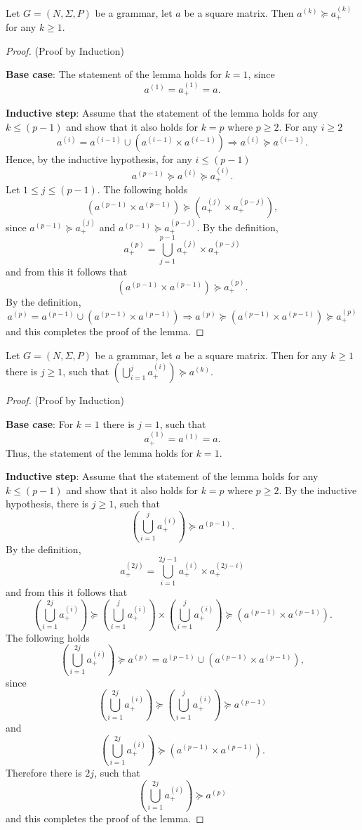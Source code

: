 \begin{lemma}\label{lemma:cf_geq_valiant}
	Let $G =(N,\Sigma,P)$ be a grammar, let $a$ be a square matrix. Then $a^{(k)} \succeq a^{(k)}_+$ for any $k \geq 1$.
\end{lemma}
\begin{proof}(Proof by Induction)
	
	\textbf{Base case}: The statement of the lemma holds for $k = 1$, since $$a^{(1)} = a^{(1)}_+ = a.$$
	
	\textbf{Inductive step}: Assume that the statement of the lemma holds for any $k \leq (p - 1)$ and show that it also holds for $k = p$ where $p \geq 2$. For any $i \geq 2$ $$a^{(i)} = a^{(i-1)} \cup (a^{(i-1)} \times a^{(i-1)}) \Rightarrow a^{(i)} \succeq a^{(i-1)}.$$ Hence, by the inductive hypothesis, for any $i \leq (p-1)$ $$a^{(p-1)} \succeq a^{(i)} \succeq a^{(i)}_+.$$ Let $1 \leq j \leq (p - 1)$. The following holds $$(a^{(p-1)} \times a^{(p-1)}) \succeq (a^{(j)}_+ \times a^{(p-j)}_+),$$ since $a^{(p-1)} \succeq a^{(j)}_+$ and $a^{(p-1)} \succeq a^{(p-j)}_+$. By the definition, $$a^{(p)}_+ = \bigcup^{p-1}_{j=1}{a^{(j)}_+ \times a^{(p-j)}_+}$$ and from this it follows that $$(a^{(p-1)} \times a^{(p-1)}) \succeq a^{(p)}_+.$$ By the definition, $$a^{(p)} = a^{(p-1)} \cup (a^{(p-1)} \times a^{(p-1)}) \Rightarrow a^{(p)} \succeq (a^{(p-1)} \times a^{(p-1)}) \succeq a^{(p)}_+$$ and this completes the proof of the lemma.
\end{proof}

\begin{lemma}\label{lemma:valiant_geq_cf}
	Let $G =(N,\Sigma,P)$ be a grammar, let $a$ be a square matrix. Then for any $k \geq 1$ there is $j \geq 1$, such that $(\bigcup^{j}_{i=1}{a^{(i)}_+}) \succeq a^{(k)}$.
\end{lemma}
\begin{proof}(Proof by Induction)
	
	\textbf{Base case}: For $k = 1$ there is $j = 1$, such that $$a^{(1)}_+ = a^{(1)} = a.$$ Thus, the statement of the lemma holds for $k = 1$.
	
	\textbf{Inductive step}: Assume that the statement of the lemma holds for any $k \leq (p - 1)$ and show that it also holds for $k = p$ where $p \geq 2$. By the inductive hypothesis, there is $j \geq 1$, such that $$(\bigcup^{j}_{i=1}{a^{(i)}_+}) \succeq a^{(p-1)}.$$ By the definition, $$a^{(2j)}_+ = \bigcup^{2j-1}_{i=1}{a^{(i)}_+ \times a^{(2j-i)}_+}$$ and from this it follows that $$(\bigcup^{2j}_{i=1}{a^{(i)}_+}) \succeq (\bigcup^{j}_{i=1}{a^{(i)}_+}) \times (\bigcup^{j}_{i=1}{a^{(i)}_+}) \succeq (a^{(p-1)} \times a^{(p-1)}).$$ The following holds $$(\bigcup^{2j}_{i=1}{a^{(i)}_+}) \succeq a^{(p)} = a^{(p-1)} \cup (a^{(p-1)} \times a^{(p-1)}),$$ since $$(\bigcup^{2j}_{i=1}{a^{(i)}_+}) \succeq (\bigcup^{j}_{i=1}{a^{(i)}_+}) \succeq a^{(p-1)}$$ and $$(\bigcup^{2j}_{i=1}{a^{(i)}_+}) \succeq (a^{(p-1)} \times a^{(p-1)}).$$ Therefore there is $2j$, such that $$(\bigcup^{2j}_{i=1}{a^{(i)}_+}) \succeq a^{(p)}$$ and this completes the proof of the lemma.	
\end{proof}

